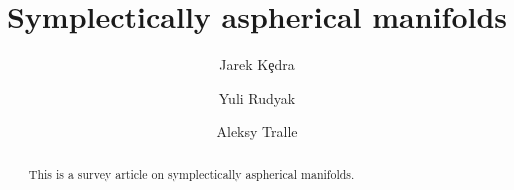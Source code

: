 \documentclass[12pt]{amsart}
\numberwithin{equation}{section}
\theoremstyle{definition}
\theoremstyle{remark}
\numberwithin{figure}{section}
\numberwithin{table}{section}
\begin{document}
 
 
 
 
\title{Symplectically aspherical manifolds} 
 
\author{Jarek K\c edra} 
 
\address{Mathematical Sciences, University of Aberdeen,  
  Meston Building, Aberdeen, AB243UE, Scotland, UK, and  
       Institute of Mathematics, University of Szczecin, 
Wielkopolska 15, 70-451 Szczecin, Poland} 
 
 
 
 
 
\author{Yuli Rudyak} 
 
\address{Department of Mathematics, University of Florida, 
358 Little Hall, Gainesville, FL 32601, USA} 
 
 
 
 
 
\author{Aleksy Tralle} 
 
\address{Department of Mathematics, University of Warmia and 
Mazury, 10-561 Olsztyn, Poland and  
Mathematical Institute, Polish Academy of Science, \'Sniadeckich 8, 00-950 
Warsaw,  
Poland} 
 
 
 
 
 
 
 
 
 
% 
 
% 
 
\begin{abstract} 
 
This is a survey article on symplectically aspherical manifolds. 
 
 
 
\end{abstract} 
 
 
 
 
 
 
 
\maketitle 
 
\end{document}

